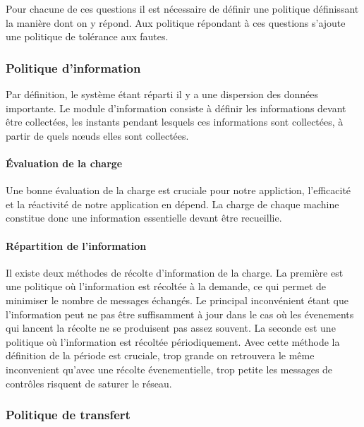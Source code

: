    Pour chacune de ces questions il est nécessaire de définir une
    politique définissant la manière dont on y répond. Aux politique
    répondant à ces questions s'ajoute une politique de tolérance aux fautes.

    \subsubsection{Politique d'information}

      Par définition, le système étant réparti il y a une dispersion
      des données importante. Le module d'information consiste à
      définir les informations devant être collectées, les instants
      pendant lesquels ces informations sont collectées, à partir de
      quels n\oe{}uds elles sont collectées.

      \paragraph{Évaluation de la charge} Une bonne évaluation de la
        charge est cruciale pour notre appliction, l'efficacité et la
        réactivité de notre application en dépend. La charge de chaque
        machine constitue donc une information essentielle devant être
        recueillie. 

      \paragraph{Répartition de l'information} Il existe deux méthodes
        de récolte d'information de la charge. La première est une
        politique où l'information est récoltée à la demande, ce qui
        permet de minimiser le nombre de messages échangés. Le
        principal inconvénient étant que l'information peut ne pas
        être suffisamment à jour dans le cas où les évenements qui
        lancent la récolte ne se produisent pas assez souvent. La
        seconde est une politique où l'information est récoltée
        périodiquement. Avec cette méthode la définition de la période
        est cruciale, trop grande on retrouvera le même inconvenient
        qu'avec une récolte évenementielle, trop petite les messages
        de contrôles risquent de saturer le réseau.
      
    \subsubsection{Politique de transfert}

